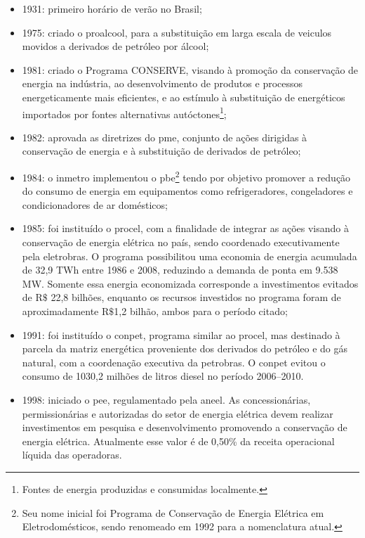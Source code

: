 \begin{itemize}
\item 1931: primeiro horário de verão no Brasil;
\item 1975: criado o \gls{proalcool}, para a substituição em larga escala de
veiculos movidos a derivados de petróleo por álcool; 
\item 1981: criado o Programa CONSERVE, visando à promoção da conservação de
energia na indústria, ao desenvolvimento de produtos e processos energeticamente
mais eficientes, e ao estímulo à substituição de energéticos importados por
fontes alternativas autóctones\footnote{Fontes de energia produzidas e
consumidas localmente.};
\item 1982: aprovada as diretrizes do \gls{pme}, conjunto de ações dirigidas à
conservação de energia e à substituição de derivados de petróleo;
\item 1984: o \gls{inmetro} implementou o \gls{pbe}\footnote{Seu nome inicial
foi Programa de Conservação de Energia Elétrica em Eletrodomésticos, sendo
renomeado em 1992 para a nomenclatura atual.} tendo por objetivo promover a
redução do consumo de energia em equipamentos como refrigeradores, congeladores e condicionadores
de ar domésticos;
\item 1985: foi instituído o \gls{procel}, com a finalidade de integrar as
ações visando à conservação de energia elétrica no país, sendo coordenado
executivamente pela \acrshort{eletrobras}. O programa possibilitou uma
economia de energia acumulada de 32,9 TWh entre
1986 e 2008, reduzindo a demanda de ponta em 9.538 MW. Somente essa energia
economizada corresponde a investimentos evitados de $\text{R\$}$ 22,8
bilhões, enquanto os recursos investidos no programa foram de aproximadamente
$\text{R\$}$1,2 bilhão, ambos para o período citado; 
\item 1991: foi instituído o \gls{conpet}, programa similar ao \gls{procel}, mas
destinado à parcela da matriz energética proveniente dos derivados do petróleo e
do gás natural, com a coordenação executiva da \acrshort{petrobras}. 
O \gls{conpet} evitou o consumo de 1030,2 milhões de litros diesel no período
2006--2010. 
\item 1998: iniciado o \gls{pee}, regulamentado pela \gls{aneel}. As concessionárias,
permissionárias e autorizadas do setor de energia elétrica devem realizar
investimentos em pesquisa e desenvolvimento promovendo a conservação de energia elétrica. 
Atualmente esse valor é de 0,50\% da receita operacional líquida das operadoras. 

\end{itemize}
